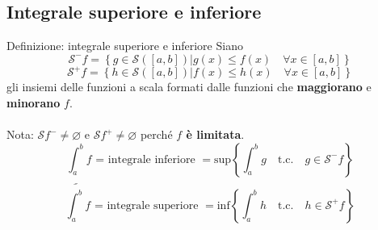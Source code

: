 \documentclass[x11names]{article}
\begin{document}
	\subsection{Integrale superiore e inferiore}
		\begin{center}
		\colorbox{myblue}{\begin{minipage}{5.75in}
				\begin{blues}{Definizione: integrale superiore e inferiore}
					Siano 
					\[
					\mathcal{S}^-f = \left\{g \in \mathcal{S}\left(\left[a,b\right]\right) | g(x) \leq f(x) \quad \forall x \in [a,b]\right\}
					\]
					\[
					\mathcal{S}^+f = \left\{h \in \mathcal{S}\left(\left[a,b\right]\right) | f(x) \leq h(x) \quad \forall x \in [a,b]\right\}
					\]
					gli insiemi delle funzioni a scala formati dalle funzioni che \textbf{maggiorano} e \textbf{minorano} $f$.\\ \\
					Nota: $\mathcal{S}f^- \neq \varnothing $ e $\mathcal{S}f^+ \neq \varnothing$ perché \textbf{$f$ è limitata}.
					\[
					\underline{\int_{a}^{b}}f \text{ = integrale inferiore } = \text{sup}\left\{\int_{a}^{b}g \quad \text{t.c.} \quad g \in \mathcal{S}^-f\right\}
					\]
					\[
					\overline{\int_{a}^{b}}f \text{ = integrale superiore } = \text{inf}\left\{\int_{a}^{b}h \quad \text{t.c.} \quad h \in \mathcal{S}^+f\right\}
					\]
				\end{blues}
		\end{minipage}}       
	\end{center}
	
\end{document}
